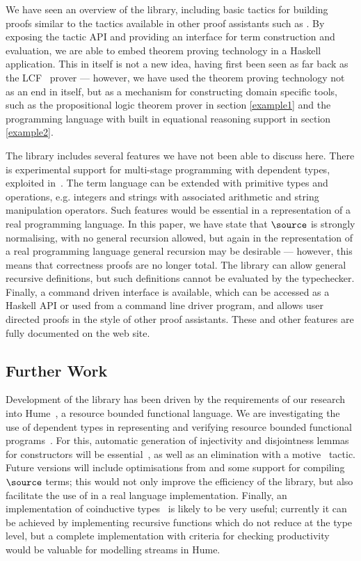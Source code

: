 We have seen an overview of the \Ivor{} library, including basic
tactics for building proofs similar to the tactics available in other
proof assistants such as \Coq{}. By exposing the tactic API and
providing an interface for term construction and evaluation, we are
able to embed theorem proving technology in a Haskell
application. This in itself is not a new idea, having first been seen
as far back as the LCF~\cite{lcf-milner} prover --- however, we have
used the theorem proving technology not as an end in itself, but as a
mechanism for constructing domain specific tools, such as the
propositional logic theorem prover in section \ref{example1} and the
programming language with built in equational reasoning support in
section \ref{example2}.

The library includes several features we have not been able to discuss
here. There is experimental support for multi-stage programming with
dependent types, exploited in~\cite{dtpmsp-gpce}.
The term language can be extended with primitive types and
operations, e.g. integers and strings with associated arithmetic and
string manipulation operators. Such features would be essential in a
representation of a real programming language. In this paper, we have
state that $\source$ is strongly normalising, with no general
recursion allowed, but again in the representation of a real
programming language general recursion may be desirable --- however,
this means that correctness proofs are no longer total. The library
can allow general recursive definitions, but such definitions cannot
be evaluated by the typechecker. Finally, a command driven interface
is available, which can be accessed as a Haskell API or used from a
command line driver program, and allows user directed proofs in the
style of other proof assistants. These and other features are fully
documented on the web site.

\subsection{Further Work}

Development of the library has been driven by the requirements of
our research into Hume~\cite{Hume-GPCE}, a resource bounded functional
language. We are investigating the use of dependent types in
representing and verifying resource bounded functional
programs~\cite{dt-framework}. For this, automatic generation of
injectivity and disjointness lemmas for constructors will be
essential~\cite{concon}, as well as an elimination with a
motive~\cite{elim-motive} tactic. Future versions will include
optimisations from \cite{brady-thesis} and some support for compiling
$\source$ terms; this would not only improve the efficiency of the
library, but also facilitate the use of \Ivor{} in a real language
implementation. Finally, an implementation of coinductive
types~\cite{coinductive} is likely to be very useful; currently it can
be achieved by implementing recursive functions which do not reduce at
the type level, but a complete implementation with criteria for
checking productivity would be valuable for modelling streams in Hume.
